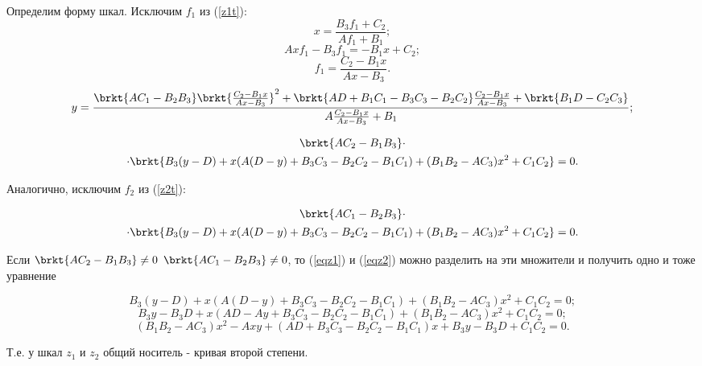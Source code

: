 Определим форму шкал.
Исключим $f_1$ из (\ref{z1t}):
$$x = \frac{B_3 f_1 + C_2}{A f_1 + B_1};$$
$$A x f_1 - B_3 f_1 = - B_1 x + C_2;$$
$$f_1  = \frac{C_2 - B_1 x}{A x - B_3}.$$
$$y = \frac{
	\brkt{A C_1 - B_2 B_3} \brkt{\frac{C_2 - B_1 x}{A x - B_3}}^2 
	+ \brkt{ A D + B_1 C_1 - B_3 C_3 - B_2 C_2 } \frac{C_2 - B_1 x}{A x - B_3} 
	+ \brkt{B_1 D - C_2 C_3}
}{A \frac{C_2 - B_1 x}{A x - B_3} + B_1};$$

\begin{multline}\label{eqz1}
\brkt{A C_2 - B_1 B_3}
\cdot \\ \cdot
\brkt{
B_3(y-D)+x(A(D-y)+B_3 C_3-B_2 C_2-B_1 C_1)+(B_1 B_2-A C_3) x^2+C_1 C_2
}  = 0.
\end{multline}

Аналогично, исключим $f_2$ из (\ref{z2t}):

\begin{multline}\label{eqz2}
\brkt{A C_1 - B_2 B_3}
\cdot \\ \cdot
\brkt{
B_3(y-D)+x(A(D-y)+B_3 C_3 - B_2 C_2 - B_1 C_1)+(B_1 B_2-A C_3) x^2+C_1 C_2
}  = 0.
\end{multline}

Если $\brkt{A C_2 - B_1 B_3} \ne 0$ $\brkt{A C_1 - B_2 B_3} \ne 0$, то (\ref{eqz1}) и (\ref{eqz2}) можно разделить на эти множители и получить одно и тоже уравнение

$$B_3(y-D)+x(A(D-y)+B_3 C_3-B_2 C_2-B_1 C_1)+(B_1 B_2-A C_3) x^2+C_1 C_2 = 0;$$
$$B_3 y - B_3 D+x(A D - A y + B_3 C_3 - B_2 C_2 - B_1 C_1)+(B_1 B_2-A C_3) x^2+C_1 C_2 = 0;$$
\begin{equation}
(B_1 B_2-A C_3) x^2 
- A x y 
+ (A D + B_3 C_3 - B_2 C_2 - B_1 C_1)x
+ B_3 y 
- B_3 D + C_1 C_2 
= 0.
\end{equation}

Т.е. у шкал $z_1$ и $z_2$ общий носитель - кривая второй степени.